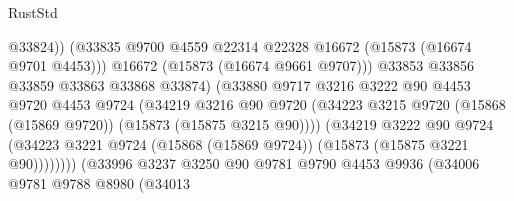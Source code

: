 \begin{lexlean}{RustStd}
\begin{coremodule}
                                            @33824))
                                        (@33835
                                          @9700
                                          @4559
                                          @22314
                                          @22328
                                          @16672
                                          (@15873 (@16674 @9701 @4453)))
                                        @16672
                                        (@15873 (@16674 @9661 @9707)))
                                      @33853
                                      @33856
                                      @33859
                                      @33863
                                      @33868
                                      @33874)
                                    (@33880
                                      @9717
                                      @3216
                                      @3222
                                      @90
                                      @4453
                                      @9720
                                      @4453
                                      @9724
                                      (@34219
                                        @3216
                                        @90
                                        @9720
                                        (@34223
                                          @3215
                                          @9720
                                          (@15868 (@15869 @9720))
                                          (@15873 (@15875 @3215 @90))))
                                      (@34219
                                        @3222
                                        @90
                                        @9724
                                        (@34223
                                          @3221
                                          @9724
                                          (@15868 (@15869 @9724))
                                          (@15873 (@15875 @3221 @90))))))))
                              (@33996
                                @3237
                                @3250
                                @90
                                @9781
                                @9790
                                @4453
                                @9936
                                (@34006
                                  @9781
                                  @9788
                                  @8980
                                  (@34013

\end{coremodule}
\end{lexlean}

